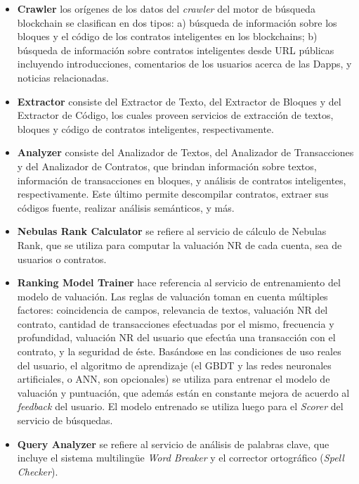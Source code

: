 \begin{itemize}
	\item \textbf{Crawler} los orígenes de los datos del \textit{crawler} del motor de búsqueda blockchain se clasifican en dos tipos: a) búsqueda de información sobre los bloques y el código de los contratos inteligentes en los blockchains; b) búsqueda de información sobre contratos inteligentes desde URL públicas incluyendo introducciones, comentarios de los usuarios acerca de las Dapps, y noticias relacionadas.

	\item \textbf{Extractor} consiste del Extractor de Texto, del Extractor de Bloques y del Extractor de Código, los cuales proveen servicios de extracción de textos, bloques y código de contratos inteligentes, respectivamente.

	\item \textbf{Analyzer} consiste del Analizador de Textos, del Analizador de Transacciones y del Analizador de Contratos, que brindan información sobre textos, información de transacciones en bloques, y análisis de contratos inteligentes, respectivamente. Este último permite descompilar contratos, extraer sus códigos fuente, realizar análisis semánticos, y más.

	\item \textbf{Nebulas Rank Calculator} se refiere al servicio de cálculo de Nebulas Rank, que se utiliza para computar la valuación NR de cada cuenta, sea de usuarios o contratos.

	\item \textbf{Ranking Model Trainer} hace referencia al servicio de entrenamiento del modelo de valuación. Las reglas de valuación toman en cuenta múltiples factores: coincidencia de campos, relevancia de textos, valuación NR del contrato, cantidad de transacciones efectuadas por el mismo, frecuencia y profundidad, valuación NR del usuario que efectúa una transacción con el contrato, y la seguridad de éste. Basándose en las condiciones de uso reales del usuario, el algoritmo de aprendizaje (el GBDT y las redes neuronales artificiales, o ANN, son opcionales) se utiliza para entrenar el modelo de valuación y puntuación, que además están en constante mejora de acuerdo al \textit{feedback} del usuario. El modelo entrenado se utiliza luego para el \textit{Scorer} del servicio de búsquedas.

	\item \textbf{Query Analyzer} se refiere al servicio de análisis de palabras clave, que incluye el sistema multilingüe \textit{Word Breaker} y el corrector ortográfico (\textit{Spell Checker}).


\end{itemize}

